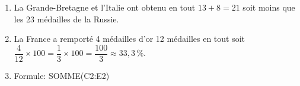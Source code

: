 \begin{enumerate}
\item %
La Grande-Bretagne et l'Italie ont obtenu en tout $13 + 8 = 21$ soit moins que les 23 médailles de la Russie.
\item %
La France a remporté 4 médailles d'or 12 médailles en tout soit $\dfrac{4}{12} \times 100 = \dfrac{1}{3} \times 100 = \dfrac{100}{3} \approx 33,3\,\%$.
\item %
Formule: SOMME(C2:E2)

\end{enumerate}

\bigskip

